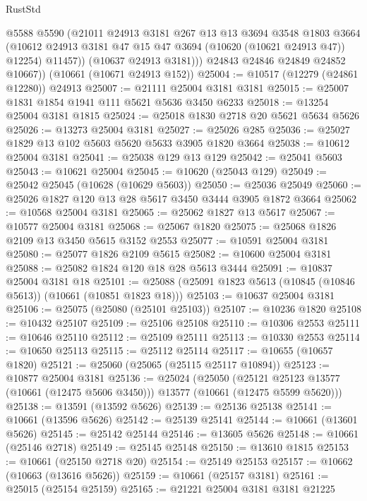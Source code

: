 \begin{lexlean}{RustStd}
\begin{coremodule}
              @5588
              @5590
              (@21011
                @24913
                @3181
                @267
                @13
                @13
                @3694
                @3548
                @1803
                @3664
                (@10612 @24913 @3181 @47 @15 @47 @3694 (@10620 (@10621 @24913 @47)) @12254)
                @11457))
            (@10637 @24913 @3181)))
        @24843
        @24846
        @24849
        @24852
        @10667))
    (@10661 (@10671 @24913 @152))
@25004 := @10517 (@12279 (@24861 @12280)) @24913
@25007 := @21111 @25004 @3181 @3181
@25015 := @25007 @1831 @1854 @1941 @111 @5621 @5636 @3450 @6233
@25018 := @13254 @25004 @3181 @1815
@25024 := @25018 @1830 @2718 @20 @5621 @5634 @5626
@25026 := @13273 @25004 @3181
@25027 := @25026 @285
@25036 := @25027 @1829 @13 @102 @5603 @5620 @5633 @3905 @1820 @3664
@25038 := @10612 @25004 @3181
@25041 := @25038 @129 @13 @129
@25042 := @25041 @5603
@25043 := @10621 @25004
@25045 := @10620 (@25043 @129)
@25049 := @25042 @25045 (@10628 (@10629 @5603))
@25050 := @25036 @25049
@25060 := @25026 @1827 @120 @13 @28 @5617 @3450 @3444 @3905 @1872 @3664
@25062 := @10568 @25004 @3181
@25065 := @25062 @1827 @13 @5617
@25067 := @10577 @25004 @3181
@25068 := @25067 @1820
@25075 := @25068 @1826 @2109 @13 @3450 @5615 @3152 @2553
@25077 := @10591 @25004 @3181
@25080 := @25077 @1826 @2109 @5615
@25082 := @10600 @25004 @3181
@25088 := @25082 @1824 @120 @18 @28 @5613 @3444
@25091 := @10837 @25004 @3181 @18
@25101 := @25088 (@25091 @1823 @5613 (@10845 (@10846 @5613)) (@10661 (@10851 @1823 @18)))
@25103 := @10637 @25004 @3181
@25106 := @25075 (@25080 (@25101 @25103))
@25107 := @10236 @1820
@25108 := @10432 @25107
@25109 := @25106 @25108
@25110 := @10306 @2553
@25111 := @10646 @25110
@25112 := @25109 @25111
@25113 := @10330 @2553
@25114 := @10650 @25113
@25115 := @25112 @25114
@25117 := @10655 (@10657 @1820)
@25121 := @25060 (@25065 (@25115 @25117 @10894))
@25123 := @10877 @25004 @3181
@25136 := @25024
    (@25050
      (@25121 @25123 @13577 (@10661 (@12475 @5606 @3450)))
      @13577
      (@10661 (@12475 @5599 @5620)))
@25138 := @13591 (@13592 @5626)
@25139 := @25136 @25138
@25141 := @10661 (@13596 @5626)
@25142 := @25139 @25141
@25144 := @10661 (@13601 @5626)
@25145 := @25142 @25144
@25146 := @13605 @5626
@25148 := @10661 (@25146 @2718)
@25149 := @25145 @25148
@25150 := @13610 @1815
@25153 := @10661 (@25150 @2718 @20)
@25154 := @25149 @25153
@25157 := @10662 (@10663 (@13616 @5626))
@25159 := @10661 (@25157 @3181)
@25161 := @25015 (@25154 @25159)
@25165 := @21221 @25004 @3181 @3181 @21225

\end{coremodule}
\end{lexlean}
